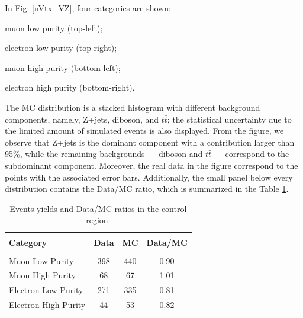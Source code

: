 In Fig. \ref{nVtx_VZ}, four categories are shown: 
\begin{compact_itemize}
\item muon low purity (top-left);
\item electron low purity (top-right);
\item muon high purity (bottom-left);
\item electron high purity (bottom-right).
\end{compact_itemize}

The MC distribution is a stacked histogram with different background components, namely, Z+jets, diboson, and $t\bar{t}$; the statistical uncertainty due to the limited amount of simulated events is also displayed. From the figure, we observe that Z+jets is the dominant component with a contribution larger than 95\%, while the remaining backgrounds --- diboson and $t\bar{t}$ --- correspond to the subdominant component. Moreover, the real data in the figure correspond to the points with the associated error bars. Additionally, the small panel below every distribution contains the Data/MC ratio, which is summarized in the Table \ref{dataMCratio}. 

\vspace{1cm}
\begin{table}[h!]
\begin{center}
\caption[Data/MC ratios]{Events yields and Data/MC ratios in the control region.}
\label{dataMCratio}
\begin{tabular}{lccc}
\hline
&&&\\[-0.2cm]
\textbf{Category}    & \textbf{Data} & \textbf{MC}   &\textbf{Data/MC} \\[0.2cm]
 \hline\hline
 &&&\\[-0.2cm]
Muon Low Purity      & 398           & 440           & 0.90 \\[0.2cm]
Muon High Purity     &  68           & 67            & 1.01 \\[0.2cm]
Electron Low Purity  & 271           & 335           & 0.81 \\[0.2cm]
Electron High Purity &  44           & 53            & 0.82 \\[0.2cm]
\hline
\end{tabular}
\end{center}
\end{table}

